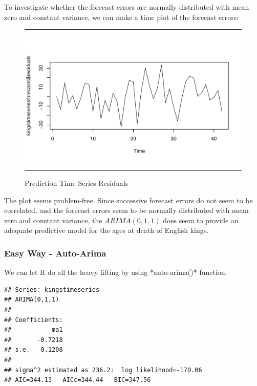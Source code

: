 \documentclass[11pt, letterpaper, twoside]{memoir}\usepackage{knitr}
\begin{document}
To investigate whether the forecast errors are normally distributed with mean zero and constant variance, we can make a time plot of the forecast errors:

\begin{figure}
\centering
\rule{4in}{1pt}
\begin{knitrout}
\color{fgcolor}\begin{kframe}
\begin{alltt}
\hlopt{$}
\end{alltt}
\end{kframe}
\includegraphics[width=\maxwidth]{figure/unnamed-chunk-130-1} 

\end{knitrout}
\caption{Prediction Time Series Residuals}
\label{Fig:tsres}
\rule{4in}{1pt}
\end{figure}


The plot seems problem-free. Since successive forecast errors do not seem to be correlated, and the forecast errors seem to be normally distributed with mean zero and constant variance, the $ARIMA(0,1,1)$ does seem to provide an adequate predictive model for the ages at death of English kings.

\subsubsection{Easy Way - Auto-Arima}

We can let R do all the heavy lifting by using *auto-arima()* function.

\begin{knitrout}
\color{fgcolor}\begin{kframe}
\begin{alltt}
 \hlkwb{<-} 
\end{alltt}
\begin{verbatim}
## Series: kingstimeseries 
## ARIMA(0,1,1)                    
## 
## Coefficients:
##           ma1
##       -0.7218
## s.e.   0.1208
## 
## sigma^2 estimated as 236.2:  log likelihood=-170.06
## AIC=344.13   AICc=344.44   BIC=347.56
\end{verbatim}
\end{kframe}
\end{knitrout}
\end{document}
